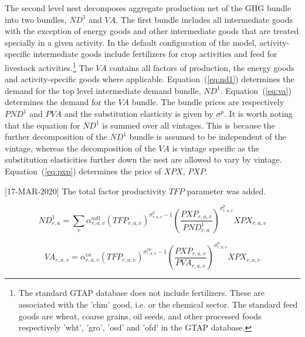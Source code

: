 \documentclass[11pt,letterpaper]{report}
\begin{document}
The second level nest decomposes aggregate production net of the GHG bundle into
two bundles, $\mathit{ND^1}$ and $\mathit{VA}$. The first bundle includes all
intermediate goods with the exception of energy goods and other intermediate
goods that are treated specially in a given activity. In the default
configuration of the model, activity-specific intermediate goods include
fertilizers for crop activities and feed for livestock
activities.\footnote{The standard GTAP database does not include fertilizers.
These are associated with the 'chm' good, i.e. or the chemical sector.
The standard feed goods are wheat, coarse grains, oil seeds, and other
processed foods respectively
'wht', 'gro', 'osd' and 'ofd' in the GTAP database.} The $\mathit{VA}$ contains all
factors of production, the energy goods and activity-specific goods where
applicable. Equation~(\ref{eq:nd1}) determines the demand for the top level
intermediate demand bundle, $\mathit{ND^1}$. Equation~(\ref{eq:va}) determines
the demand for the $\mathit{VA}$ bundle. The bundle prices are respectively
$\mathit{PND}^1$ and $\mathit{PVA}$ and the substitution elasticity is given by
$\sigma^{\mathit{p}}$. It is worth noting that the equation for $\mathit{ND}^1$
is summed over all vintages. This is because the further decomposition of the
$\mathit{ND}^1$ bundle is assumed to be independent of the vintage, whereas the
decomposition of the $\mathit{VA}$ is vintage specific as the substitution
elasticities further down the nest are allowed to vary by vintage.
Equation~(\ref{eq:pxp}) determines the price of $\mathit{XPX}$, $\mathit{PXP}$.

[17-MAR-2020] The total factor productivity $\mathit{TFP}$ parameter was added.

\begin{equation}
\label{eq:nd1}
\mathit{ND}^1_{r,a} =
   \sum_v{
      \alpha^{\mathit{nd1}}_{\mathit{r,a,v}}
      \left( \mathit{TFP}_{\mathit{r,a,v}}
      \right)^{\sigma^{\mathit{p}}_{\mathit{r,a,v}}-1}
      \left( \frac {\mathit{PXP}_{r,a,v}} {\mathit{PND}^1_{r,a}}
      \right)^{\sigma^{\mathit{p}}_{\mathit{r,a,v}}}
      \mathit{XPX}_{r,a,v}
   }
\end{equation}

\begin{equation}
\label{eq:va}
\mathit{VA}_{r,a,v} =
   \alpha^{\mathit{va}}_{\mathit{r,a,v}}
   \left( \mathit{TFP}_{\mathit{r,a,v}}
   \right)^{\sigma^{\mathit{xp}}_{\mathit{r,a,v}}-1}
   \left( \frac{\mathit{PXP}_{r,a,v}} {\mathit{PVA}_{r,a,v}}
   \right)^{\sigma^{\mathit{p}}_{\mathit{r,a,v}}}
   \mathit{XPX}_{r,a,v}
\end{equation}
\end{document}
